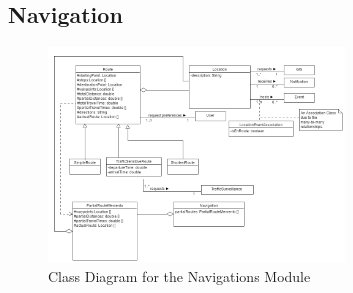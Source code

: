 \documentclass[runningheads,a4paper]{article}
\begin{document}
\subsection{Navigation}

\begin{figure}[H]
   	\centering
   	\includegraphics[width=0.7\textwidth]{Navigation-Module-Class-Diagram.png}
   	\caption{Class Diagram for the Navigations Module}
\end{figure}
\end{document}
